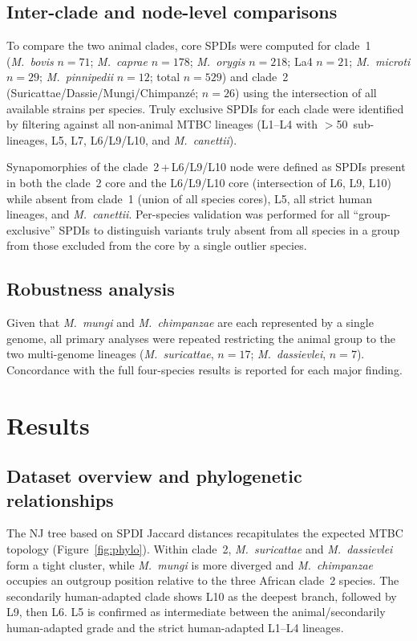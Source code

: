 \documentclass[11pt,a4paper]{article}
\newcommand{\Msur}{\textit{M.~suricattae}}
\newcommand{\Mmun}{\textit{M.~mungi}}
\newcommand{\Mdas}{\textit{M.~dassievlei}}
\newcommand{\Mchi}{\textit{M.~chimpanzae}}
\begin{document}
\subsection{Inter-clade and node-level comparisons}
\label{sec:methods:inter_clade}

To compare the two animal clades, core SPDIs were computed for clade~1
(\textit{M.~bovis} $n = 71$; \textit{M.~caprae} $n = 178$;
\textit{M.~orygis} $n = 218$; La4 $n = 21$; \textit{M.~microti} $n = 29$;
\textit{M.~pinnipedii} $n = 12$; total $n = 529$) and clade~2
(Suricattae/Dassie/Mungi/Chimpanzé; $n = 26$) using the intersection of
all available strains per species.
%
Truly exclusive SPDIs for each clade were identified by filtering against
all non-animal MTBC lineages (L1--L4 with $>$50~sub-lineages, L5, L7,
L6/L9/L10, and \textit{M.~canettii}).

Synapomorphies of the clade~2\,+\,L6/L9/L10 node were defined as SPDIs
present in both the clade~2 core and the L6/L9/L10 core (intersection of
L6, L9, L10) while absent from clade~1 (union of all species cores), L5,
all strict human lineages, and \textit{M.~canettii}.
%
Per-species validation was performed for all ``group-exclusive'' SPDIs to
distinguish variants truly absent from all species in a group from those
excluded from the core by a single outlier species.

\subsection{Robustness analysis}
\label{sec:methods:robust}

Given that \Mmun{} and \Mchi{} are each represented by a single genome,
all primary analyses were repeated restricting the animal group to the
two multi-genome lineages (\Msur{}, $n = 17$; \Mdas{}, $n = 7$).
%
Concordance with the full four-species results is reported for each major finding.

\section{Results}
\label{sec:results}

\subsection{Dataset overview and phylogenetic relationships}
\label{sec:results:phylo}

The NJ tree based on SPDI Jaccard distances recapitulates the expected
MTBC topology (Figure~\ref{fig:phylo}).
%
Within clade~2, \Msur{} and \Mdas{} form a tight cluster, while
\Mmun{} is more diverged and \Mchi{} occupies an outgroup position relative
to the three African clade~2 species.
%
The secondarily human-adapted clade shows L10 as the deepest branch, followed by L9, then L6.
%
L5 is confirmed as intermediate between the animal/secondarily human-adapted grade and the
strict human-adapted L1--L4 lineages.
\end{document}

